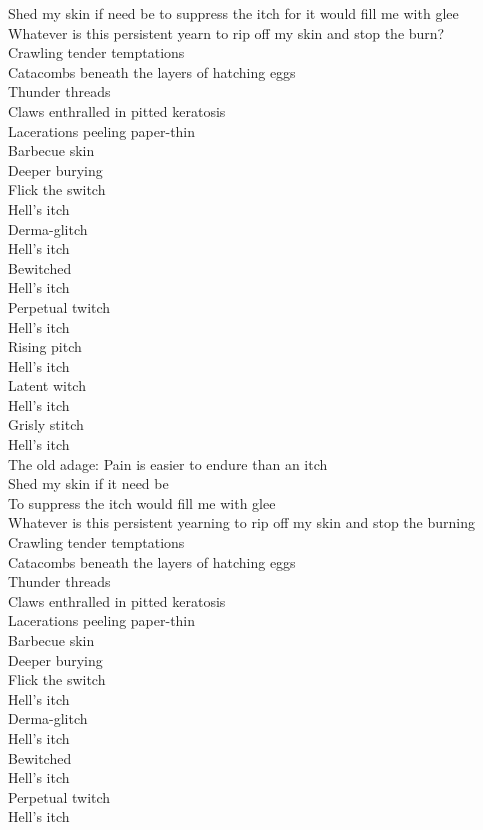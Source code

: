 Shed my skin if need be to suppress the itch for it would fill me with glee \\
Whatever is this persistent yearn to rip off my skin and stop the burn? \\
Crawling tender temptations \\
Catacombs beneath the layers of hatching eggs \\
Thunder threads \\
Claws enthralled in pitted keratosis \\
Lacerations peeling paper-thin \\
Barbecue skin \\
Deeper burying \\

Flick the switch \\
Hell's itch \\
Derma-glitch \\
Hell's itch \\
Bewitched \\
Hell's itch \\
Perpetual twitch \\
Hell's itch \\
Rising pitch \\
Hell's itch \\
Latent witch \\
Hell's itch \\
Grisly stitch \\
Hell's itch \\
The old adage: Pain is easier to endure than an itch \\

Shed my skin if it need be \\
To suppress the itch would fill me with glee \\
Whatever is this persistent yearning to rip off my skin and stop the burning \\
Crawling tender temptations \\
Catacombs beneath the layers of hatching eggs \\
Thunder threads \\
Claws enthralled in pitted keratosis \\
Lacerations peeling paper-thin \\
Barbecue skin \\
Deeper burying \\

Flick the switch \\
Hell's itch \\
Derma-glitch \\
Hell's itch \\
Bewitched \\
Hell's itch \\
Perpetual twitch \\
Hell's itch \\

